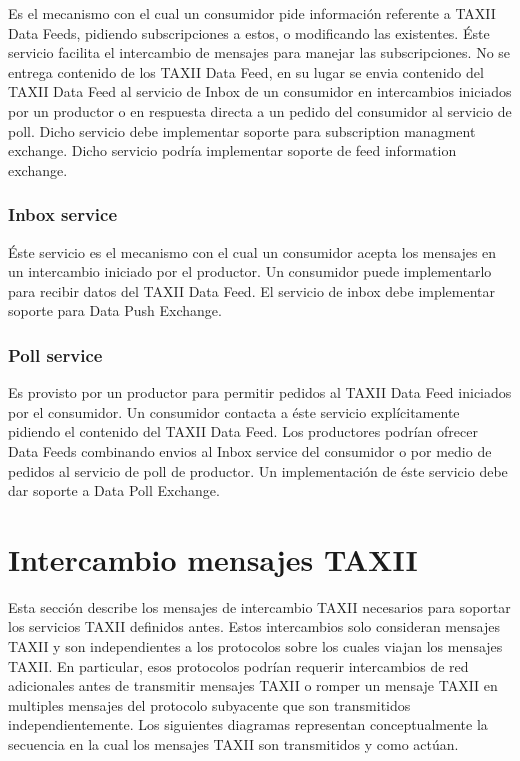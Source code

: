 Es el mecanismo con el cual un consumidor pide información referente a TAXII 
Data Feeds, pidiendo subscripciones a estos, o modificando las existentes. Éste 
servicio facilita el intercambio de mensajes para manejar las subscripciones. 
No se entrega contenido de los TAXII Data Feed, en su lugar se envia 
contenido del TAXII Data Feed al servicio de Inbox de un consumidor en intercambios 
iniciados por un productor o en respuesta directa a un pedido del consumidor al 
servicio de poll.
Dicho servicio debe implementar soporte para subscription managment exchange.
Dicho servicio podría implementar soporte de feed information exchange.

\subsubsection{Inbox service}
Éste servicio es el mecanismo con el cual un consumidor acepta los mensajes en 
un intercambio iniciado por el productor. Un consumidor puede implementarlo 
para recibir datos del TAXII Data Feed.
El servicio de inbox debe implementar soporte para Data Push Exchange.

\subsubsection{Poll service}
Es provisto por un productor para permitir pedidos al TAXII Data Feed iniciados 
por  el consumidor. Un consumidor contacta a éste servicio explícitamente 
pidiendo el contenido del TAXII Data Feed. Los productores podrían ofrecer Data 
Feeds combinando envios al Inbox service del consumidor o por medio de pedidos 
al servicio de poll de productor.
Un implementación de éste servicio debe dar soporte a Data Poll Exchange.


\section{Intercambio mensajes TAXII}
Esta sección describe los mensajes de intercambio TAXII necesarios para soportar 
los servicios TAXII definidos antes. Estos intercambios solo consideran mensajes 
TAXII y son independientes a los protocolos sobre los cuales viajan los mensajes 
TAXII. En particular, esos protocolos podrían requerir intercambios de red 
adicionales antes de transmitir mensajes TAXII o romper un mensaje TAXII en 
multiples mensajes del protocolo subyacente que son transmitidos 
independientemente. Los siguientes diagramas representan conceptualmente la 
secuencia en la cual los mensajes TAXII son transmitidos y como actúan.

